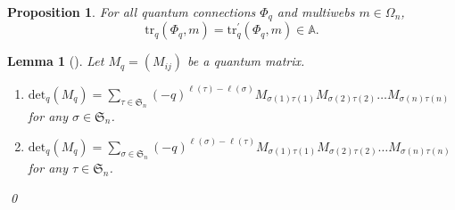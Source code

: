 \documentclass[12pt, reqno]{amsart}
\newtheorem{prop}[theo]{Proposition}
\newtheorem{lemma}[theo]{Lemma}
\theoremstyle{definition}
\renewcommand{\det}{\mathrm{det}}%
\newcommand{\trqc}{\mathrm{tr}_q}%
\begin{document}
\begin{prop}\label{prop:comparisonofqtraces}
For all quantum connections $\Phi_q$ and multiwebs $m\in\Omega_n$,
$$
\trqc(\Phi_q,m)=\trqc^\prime(\Phi_q,m)\in\mathbb{A}.
$$
\end{prop}

\begin{lemma}[\cite{parshall_wang}] \label{lem:qdet_orders}
Let $M_q=(M_{ij})$ be a quantum matrix.
\begin{enumerate}
\item 
$\displaystyle \det_q(M_q) = \sum_{\tau \in \mathfrak{S}_n} (-q)^{\ell(\tau)-\ell(\sigma)} M_{\sigma(1)\tau(1)}M_{\sigma(2)\tau(2)} \dots M_{\sigma(n)\tau(n)}$ for any $\sigma \in \mathfrak{S}_n$.
\item 
$\displaystyle \det_q(M_q) = \sum_{\sigma \in \mathfrak{S}_n} (-q)^{\ell(\sigma)-\ell(\tau)} M_{\sigma(1)\tau(1)}M_{\sigma(2)\tau(2)} \dots M_{\sigma(n)\tau(n)}$ for any $\tau \in \mathfrak{S}_n$.
\end{enumerate}
\qed\end{lemma}
\end{document}
